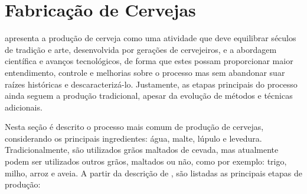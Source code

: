 \section{Fabricação de Cervejas}

 apresenta a produção de cerveja como uma atividade que deve equilibrar 
séculos de tradição e arte, desenvolvida por gerações de cervejeiros, e a abordagem científica 
e avanços tecnológicos, de forma que estes possam proporcionar maior entendimento, controle e melhorias 
sobre o processo mas sem abandonar suar raízes históricas e descaracterizá-lo. 
Justamente, as etapas principais do processo ainda seguem a produção tradicional, apesar
da evolução de métodos e técnicas adicionais.

Nesta seção é descrito o processo mais comum de produção de cervejas, considerando os principais
ingredientes: água, malte, lúpulo e levedura. Tradicionalmente, são utilizados grãos maltados de cevada,
mas atualmente podem ser utilizados outros grãos, maltados ou não, como por exemplo: trigo, milho, arroz e aveia.
A partir da descrição de , são listadas as principais etapas de produção:


